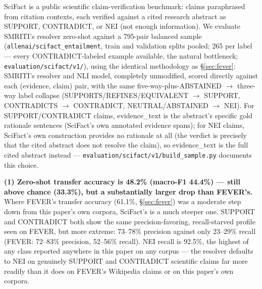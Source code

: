 

SciFact \citep{wadden2020fact} is a public scientific claim-verification
benchmark: claims paraphrased from citation contexts, each verified
against a cited research abstract as SUPPORT, CONTRADICT, or NEI (not
enough information). We evaluate SMRITI's resolver zero-shot against a
795-pair balanced sample (\texttt{allenai/scifact\_entailment}, train and
validation splits pooled; 265 per label --- every CONTRADICT-labeled
example available, the natural bottleneck; \texttt{evaluation/scifact/v1/}),
using the identical methodology as \S\ref{sec:fever}: SMRITI's resolver
and NLI model, completely unmodified, scored directly against each
(evidence, claim) pair, with the same five-way-plus-ABSTAINED $\to$
three-way label collapse (SUPPORTS/REFINES/EQUIVALENT $\to$ SUPPORT,
CONTRADICTS $\to$ CONTRADICT, NEUTRAL/ABSTAINED $\to$ NEI). For
SUPPORT/CONTRADICT claims, evidence\_text is the abstract's specific
gold rationale sentences (SciFact's own annotated evidence spans); for
NEI claims, SciFact's own construction provides no rationale at all (the
verdict is precisely that the cited abstract does not resolve the claim),
so evidence\_text is the full cited abstract instead ---
\texttt{evaluation/scifact/v1/build\_sample.py} documents this choice.

\textbf{(1) Zero-shot transfer accuracy is 48.2\% (macro-F1 44.4\%) ---
still above chance (33.3\%), but a substantially larger drop than
FEVER's.} Where FEVER's transfer accuracy (61.1\%, \S\ref{sec:fever}) was
a moderate step down from this paper's own corpora, SciFact's is a much
steeper one. SUPPORT and CONTRADICT both show the same
precision-favoring, recall-starved profile seen on FEVER, but more
extreme: 73--78\% precision against only 23--29\% recall (FEVER: 72--83\%
precision, 52--56\% recall). NEI recall is 92.5\%, the highest of any
class reported anywhere in this paper on any corpus --- the resolver
defaults to NEI on genuinely SUPPORT and CONTRADICT scientific claims
far more readily than it does on FEVER's Wikipedia claims or on this
paper's own corpora.


